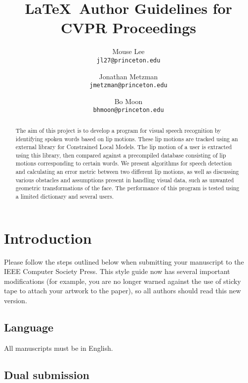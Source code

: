 \documentclass[10pt,twocolumn,letterpaper]{article}
\begin{document}
\title{\LaTeX\ Author Guidelines for CVPR Proceedings}

\author{Mouse Lee\\
{\tt\small jl27@princeton.edu}
\and
Jonathan Metzman\\
{\tt\small jmetzman@princeton.edu}
\and
Bo Moon\\
{\tt\small bhmoon@princeton.edu}
}



\maketitle

\begin{abstract}
  The aim of this project is to develop a program for visual speech recognition by identifying spoken words based on lip motions. These lip motions are tracked using an external library for Constrained Local Models. The lip motion of a user is extracted using this library, then compared against a precompiled database consisting of lip motions corresponding to certain words. We present algorithms for speech detection and calculating an error metric between two different lip motions, as well as discussing various obstacles and assumptions present in handling visual data, such as unwanted geometric transformations of the face. The performance of this program is tested using a limited dictionary and several users.
\end{abstract}

\section{Introduction}

Please follow the steps outlined below when submitting your manuscript to
the IEEE Computer Society Press.  This style guide now has several
important modifications (for example, you are no longer warned against the
use of sticky tape to attach your artwork to the paper), so all authors
should read this new version.

\subsection{Language}

All manuscripts must be in English.

\subsection{Dual submission}
\end{document}
